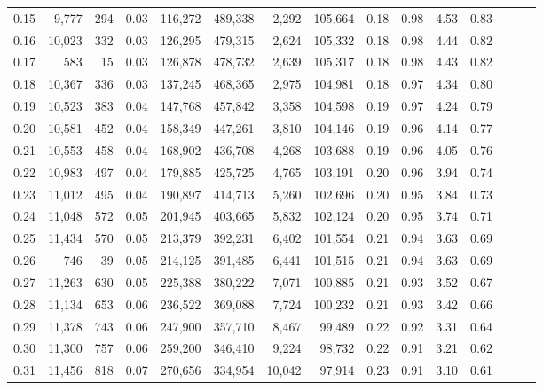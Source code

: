 \begin{tabular}{rrrrrrrrrrrrrrr}
0.15 &   9,777 &    294 &  0.03 &  116,272 &  489,338 &    2,292 &  105,664 &  0.18 &  0.98 &  4.53 &      0.83 \\
0.16 &  10,023 &    332 &  0.03 &  126,295 &  479,315 &    2,624 &  105,332 &  0.18 &  0.98 &  4.44 &      0.82 \\
0.17 &     583 &     15 &  0.03 &  126,878 &  478,732 &    2,639 &  105,317 &  0.18 &  0.98 &  4.43 &      0.82 \\
0.18 &  10,367 &    336 &  0.03 &  137,245 &  468,365 &    2,975 &  104,981 &  0.18 &  0.97 &  4.34 &      0.80 \\
0.19 &  10,523 &    383 &  0.04 &  147,768 &  457,842 &    3,358 &  104,598 &  0.19 &  0.97 &  4.24 &      0.79 \\
0.20 &  10,581 &    452 &  0.04 &  158,349 &  447,261 &    3,810 &  104,146 &  0.19 &  0.96 &  4.14 &      0.77 \\
0.21 &  10,553 &    458 &  0.04 &  168,902 &  436,708 &    4,268 &  103,688 &  0.19 &  0.96 &  4.05 &      0.76 \\
0.22 &  10,983 &    497 &  0.04 &  179,885 &  425,725 &    4,765 &  103,191 &  0.20 &  0.96 &  3.94 &      0.74 \\
0.23 &  11,012 &    495 &  0.04 &  190,897 &  414,713 &    5,260 &  102,696 &  0.20 &  0.95 &  3.84 &      0.73 \\
0.24 &  11,048 &    572 &  0.05 &  201,945 &  403,665 &    5,832 &  102,124 &  0.20 &  0.95 &  3.74 &      0.71 \\
0.25 &  11,434 &    570 &  0.05 &  213,379 &  392,231 &    6,402 &  101,554 &  0.21 &  0.94 &  3.63 &      0.69 \\
0.26 &     746 &     39 &  0.05 &  214,125 &  391,485 &    6,441 &  101,515 &  0.21 &  0.94 &  3.63 &      0.69 \\
0.27 &  11,263 &    630 &  0.05 &  225,388 &  380,222 &    7,071 &  100,885 &  0.21 &  0.93 &  3.52 &      0.67 \\
0.28 &  11,134 &    653 &  0.06 &  236,522 &  369,088 &    7,724 &  100,232 &  0.21 &  0.93 &  3.42 &      0.66 \\
0.29 &  11,378 &    743 &  0.06 &  247,900 &  357,710 &    8,467 &   99,489 &  0.22 &  0.92 &  3.31 &      0.64 \\
0.30 &  11,300 &    757 &  0.06 &  259,200 &  346,410 &    9,224 &   98,732 &  0.22 &  0.91 &  3.21 &      0.62 \\
0.31 &  11,456 &    818 &  0.07 &  270,656 &  334,954 &   10,042 &   97,914 &  0.23 &  0.91 &  3.10 &      0.61 \\

\end{tabular}
